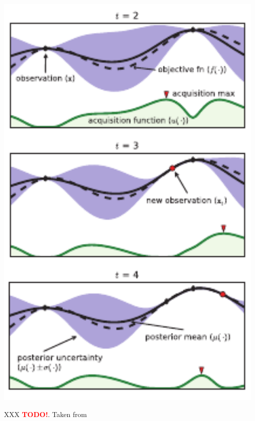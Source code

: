 \documentclass[a4paper, twoside, nobib]{tufte-book}
\newcommand{\TODO}{\textcolor{red}{\bf TODO!}\xspace}
\begin{document}
\begin{marginfigure}
  \includegraphics[width=0.99\textwidth]{figures/bayesian_optimization/bo.pdf}
  \caption[Bayesian Optimization]{XXX \TODO. Taken from \citet{brochuTutorialBayesianOptimization2010}}
  \label{fig:ml:bayesian_optimization}
\end{marginfigure}
\end{document}
